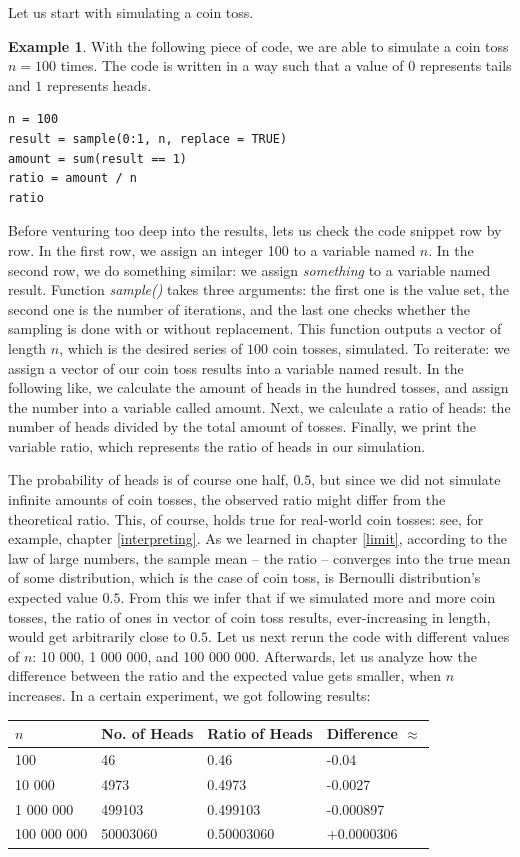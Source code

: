 \documentclass[12pt,a4paper,leqno]{report}
\theoremstyle{plain}
\theoremstyle{definition}
\newtheorem{esim}[equation]{Example}
\begin{document}
Let us start with simulating a coin toss.

\begin{esim}
With the following piece of code, we are able to simulate a coin toss $n = 100$ times. The code is written in a way such that a value of $0$ represents tails and $1$ represents heads.
\begin{verbatim}
n = 100
result = sample(0:1, n, replace = TRUE)
amount = sum(result == 1)
ratio = amount / n
ratio
\end{verbatim}
Before venturing too deep into the results, lets us check the code snippet row by row. In the first row, we assign an integer 100 to a variable named $n$. In the second row, we do something similar: we assign \emph{something} to a variable named result. Function \emph{sample()} takes three arguments: the first one is the value set, the second one is the number of iterations, and the last one checks whether the sampling is done with or without replacement. This function outputs a vector of length $n$, which is the desired series of $100$ coin tosses, simulated. To reiterate: we assign a vector of our coin toss results into a variable named result. In the following like, we calculate the amount of heads in the hundred tosses, and assign the number into a variable called amount. Next, we calculate a ratio of heads: the number of heads divided by the total amount of tosses. Finally, we print the variable ratio, which represents the ratio of heads in our simulation.

The probability of heads is of course one half, $0.5$, but since we did not simulate infinite amounts of coin tosses, the observed ratio might differ from the theoretical ratio. This, of course, holds true for real-world coin tosses: see, for example, chapter \ref{interpreting}. As we learned in chapter \ref{limit}, according to the law of large numbers, the sample mean -- the ratio -- converges into the true mean of some distribution, which is the case of coin toss, is Bernoulli distribution's expected value $0.5$. From this we infer that if we simulated more and more coin tosses, the ratio of ones in vector of coin toss results, ever-increasing in length, would get arbitrarily close to $0.5$. Let us next rerun the code with different values of $n$: 10 000, 1 000 000, and 100 000 000. Afterwards, let us analyze how the difference between the ratio and the expected value gets smaller, when $n$ increases. In a certain experiment, we got following results:

\begin{tabular}{l l l l }
\toprule
$n$  & No. of Heads & Ratio of Heads & Difference $\approx$ \\
\midrule 
100 & 46 & 0.46 & -0.04 \\
10 000 & 4973  & 0.4973 & -0.0027\\
1 000 000 &  499103& 0.499103 & -0.000897\\
100 000 000 & 50003060 & 0.50003060 & +0.0000306\\
\bottomrule 
\end{tabular}


\end{esim}
\end{document}
